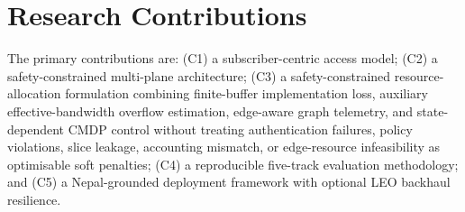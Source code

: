 \section{Research Contributions}
\label{sec:contributions}

The primary contributions are: (C1) a subscriber-centric access model; (C2) a safety-constrained multi-plane architecture; (C3) a safety-constrained resource-allocation formulation combining finite-buffer implementation loss, auxiliary effective-bandwidth overflow estimation, edge-aware graph telemetry, and state-dependent CMDP control without treating authentication failures, policy violations, slice leakage, accounting mismatch, or edge-resource infeasibility as optimisable soft penalties; (C4) a reproducible five-track evaluation methodology; and (C5) a Nepal-grounded deployment framework with optional LEO backhaul resilience.

